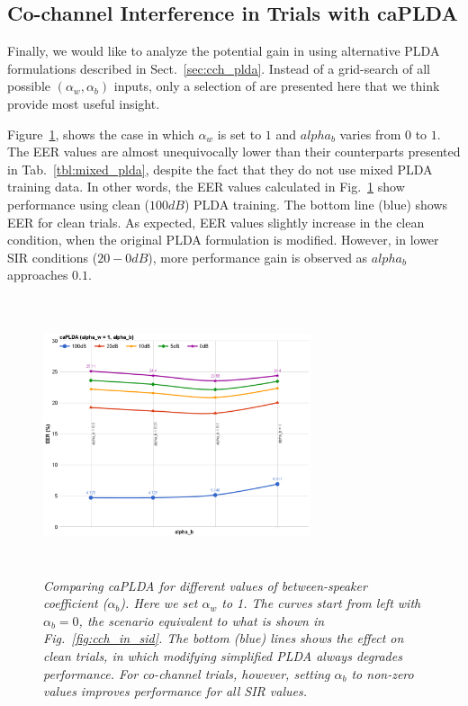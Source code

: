 \subsection{Co-channel Interference in Trials with caPLDA}
\label{ssec:caplda_exp}
Finally, we would like to analyze the potential gain in using alternative PLDA formulations described in Sect.~\ref{sec:cch_plda}. 
Instead of a grid-search of all possible $(\alpha_w,\alpha_b)$ inputs, only a selection of are presented here that we think provide most useful insight. 

Figure~\ref{fig:alpha_w_is_1}, shows the case in which $\alpha_w$ is set to $1$ and $alpha_b$ varies from $0$ to $1$. 
The EER values are almost unequivocally lower than their counterparts presented in Tab.~\ref{tbl:mixed_plda}, despite the fact that they do not use mixed PLDA training data. 
In other words, the EER values calculated in Fig.~\ref{fig:alpha_w_is_1} show performance using clean ($100dB$) PLDA training. 
The bottom line (blue) shows EER for clean trials. 
As expected, EER values slightly increase in the clean condition, when the original PLDA formulation is modified. 
However, in lower SIR conditions ($20-0dB$), more performance gain is observed as $alpha_b$ approaches $0.1$. 

\begin{figure}[h!]
	\centering
	\includegraphics[height = 3.2in, width=0.7\textwidth]{figures/eer_vs_alphab}
	\vspace{-2mm}
	\caption{\it \small Comparing caPLDA for different values of between-speaker coefficient ($\alpha_b$). Here we set $\alpha_w$ to 1. The curves start from left with $\alpha_b = 0$, the scenario equivalent to what is shown in Fig.~\ref{fig:cch_in_sid}. The bottom (blue) lines shows the effect on clean trials, in which modifying simplified PLDA always degrades performance. For co-channel trials, however, setting $\alpha_b$ to non-zero values improves performance for all SIR values.}
	\label{fig:alpha_w_is_1}
	\vspace{-1mm}
\end{figure}

